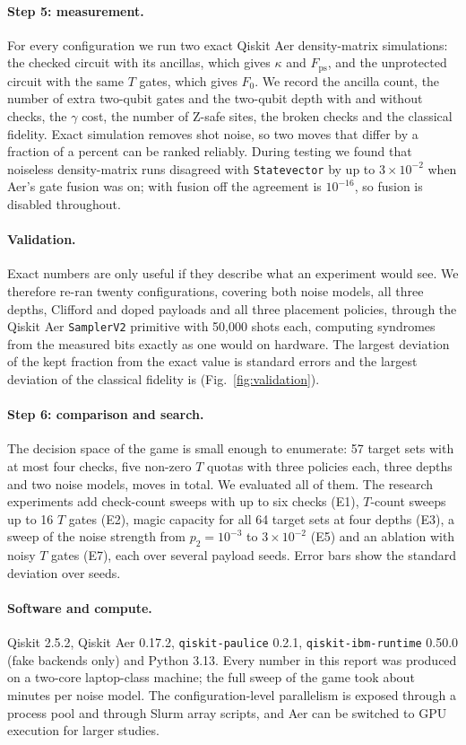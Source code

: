 \paragraph*{Step 5: measurement.} For every configuration we run two exact Qiskit Aer density-matrix simulations: the checked circuit with its ancillas, which gives $\kappa$ and $F_{\mathrm{ps}}$, and the unprotected circuit with the same $T$ gates, which gives $F_0$. We record the ancilla count, the number of extra two-qubit gates and the two-qubit depth with and without checks, the $\gamma$ cost, the number of Z-safe sites, the broken checks and the classical fidelity. Exact simulation removes shot noise, so two moves that differ by a fraction of a percent can be ranked reliably. During testing we found that noiseless density-matrix runs disagreed with \texttt{Statevector} by up to $3\times10^{-2}$ when Aer's gate fusion was on; with fusion off the agreement is $10^{-16}$, so fusion is disabled throughout.

\paragraph*{Validation.} Exact numbers are only useful if they describe what an experiment would see. We therefore re-ran twenty configurations, covering both noise models, all three depths, Clifford and doped payloads and all three placement policies, through the Qiskit Aer \texttt{SamplerV2} primitive with 50{,}000 shots each, computing syndromes from the measured bits exactly as one would on hardware. The largest deviation of the kept fraction from the exact value is \ValKeepSigma{} standard errors and the largest deviation of the classical fidelity is \ValHdiff{} (Fig.~\ref{fig:validation}).

\paragraph*{Step 6: comparison and search.} The decision space of the game is small enough to enumerate: 57 target sets with at most four checks, five non-zero $T$ quotas with three policies each, three depths and two noise models, \NumMoves{} moves in total. We evaluated all of them. The research experiments add check-count sweeps with up to six checks (E1), $T$-count sweeps up to 16 $T$ gates (E2), magic capacity for all 64 target sets at four depths (E3), a sweep of the noise strength from $p_2=10^{-3}$ to $3\times10^{-2}$ (E5) and an ablation with noisy $T$ gates (E7), each over several payload seeds. Error bars show the standard deviation over seeds.

\paragraph*{Software and compute.} Qiskit 2.5.2, Qiskit Aer 0.17.2, \texttt{qiskit-paulice} 0.2.1, \texttt{qiskit-ibm-runtime} 0.50.0 (fake backends only) and Python 3.13. Every number in this report was produced on a two-core laptop-class machine; the full sweep of the game took about \GridMinutes{} minutes per noise model. The configuration-level parallelism is exposed through a process pool and through Slurm array scripts, and Aer can be switched to GPU execution for larger studies.
